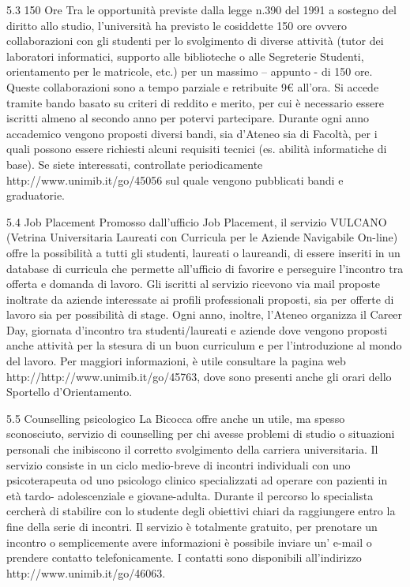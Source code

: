 5.3 150 Ore
Tra le opportunità previste dalla legge n.390 del 1991 a sostegno del diritto allo studio, l'università ha previsto le cosiddette 150 ore ovvero collaborazioni con gli studenti per lo svolgimento di diverse attività (tutor dei laboratori informatici, supporto alle biblioteche o alle Segreterie Studenti, orientamento per le matricole, etc.) per un massimo – appunto - di 150 ore. Queste collaborazioni sono a tempo parziale e retribuite 9€ all'ora. Si accede tramite bando basato su criteri di reddito e merito, per cui è necessario essere iscritti almeno al secondo anno per potervi partecipare. Durante ogni anno accademico vengono proposti diversi bandi, sia d'Ateneo sia di Facoltà, per i quali possono essere richiesti alcuni requisiti tecnici (es. abilità informatiche di base). Se siete interessati, controllate periodicamente http://www.unimib.it/go/45056 sul quale vengono pubblicati bandi e graduatorie.

5.4 Job Placement
Promosso dall'ufficio Job Placement, il servizio VULCANO (Vetrina Universitaria Laureati con Curricula per le Aziende Navigabile On-line) offre la possibilità a tutti gli studenti, laureati o laureandi, di essere inseriti in un database di curricula che permette all'ufficio di favorire e perseguire l'incontro tra offerta e domanda di lavoro. Gli iscritti al servizio ricevono via mail
proposte inoltrate da aziende interessate ai profili professionali proposti, sia per offerte di lavoro sia per possibilità di stage.
Ogni anno, inoltre, l'Ateneo organizza il Career Day, giornata d'incontro tra studenti/laureati e aziende dove vengono proposti anche attività per la stesura di un buon curriculum e per l'introduzione al mondo del lavoro.
Per maggiori informazioni, è utile consultare la pagina web http://http://www.unimib.it/go/45763, dove sono presenti anche gli orari dello Sportello d'Orientamento.

5.5 Counselling psicologico
La Bicocca offre anche un utile, ma spesso sconosciuto, servizio di counselling per chi avesse problemi di studio o situazioni personali che inibiscono il corretto svolgimento della carriera universitaria. Il servizio consiste in un ciclo medio-breve di incontri individuali con uno psicoterapeuta od uno psicologo clinico specializzati ad operare con pazienti in età tardo- adolescenziale e giovane-adulta. Durante il percorso lo specialista cercherà di stabilire con lo studente degli obiettivi chiari da raggiungere entro la fine della serie di incontri.
Il servizio è totalmente gratuito, per prenotare un incontro o semplicemente avere informazioni è possibile inviare un' e-mail o prendere contatto telefonicamente. I contatti sono disponibili all'indirizzo http://www.unimib.it/go/46063.

